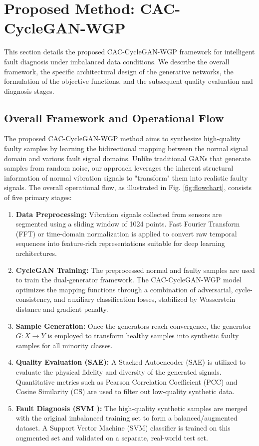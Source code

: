 \section{Proposed Method: CAC-CycleGAN-WGP}
\label{sec:proposed_method}

This section details the proposed CAC-CycleGAN-WGP framework for intelligent fault diagnosis under imbalanced data conditions. We describe the overall framework, the specific architectural design of the generative networks, the formulation of the objective functions, and the subsequent quality evaluation and diagnosis stages.

\subsection{Overall Framework and Operational Flow}
The proposed CAC-CycleGAN-WGP method aims to synthesize high-quality faulty samples by learning the bidirectional mapping between the normal signal domain and various fault signal domains. Unlike traditional GANs that generate samples from random noise, our approach leverages the inherent structural information of normal vibration signals to "transform" them into realistic faulty signals. The overall operational flow, as illustrated in Fig. \ref{fig:flowchart}, consists of five primary stages:

\begin{enumerate}
    \item \textbf{Data Preprocessing:} Vibration signals collected from sensors are segmented using a sliding window of 1024 points. Fast Fourier Transform (FFT) or time-domain normalization is applied to convert raw temporal sequences into feature-rich representations suitable for deep learning architectures.
    \item \textbf{CycleGAN Training:} The preprocessed normal and faulty samples are used to train the dual-generator framework. The CAC-CycleGAN-WGP model optimizes the mapping functions through a combination of adversarial, cycle-consistency, and auxiliary classification losses, stabilized by Wasserstein distance and gradient penalty.
    \item \textbf{Sample Generation:} Once the generators reach convergence, the generator $G: X \to Y$ is employed to transform healthy samples into synthetic faulty samples for all minority classes.
    \item \textbf{Quality Evaluation (SAE):} A Stacked Autoencoder (SAE) is utilized to evaluate the physical fidelity and diversity of the generated signals. Quantitative metrics such as Pearson Correlation Coefficient (PCC) and Cosine Similarity (CS) are used to filter out low-quality synthetic data.
    \item \textbf{Fault Diagnosis (SVM \cite{vapnik1995smt}):} The high-quality synthetic samples are merged with the original imbalanced training set to form a balanced/augmented dataset. A Support Vector Machine (SVM) classifier is trained on this augmented set and validated on a separate, real-world test set.
\end{enumerate}

